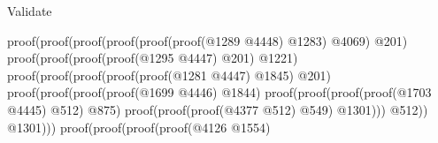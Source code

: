 \begin{lexlean}{Validate}
\begin{coremodule}
                                                                proof(proof(proof(proof(proof(proof(@1289
                                                                              @4448)
                                                                            @1283)
                                                                          @4069)
                                                                        @201)
                                                                      proof(proof(proof(proof(@1295
                                                                                @4447)
                                                                              @201)
                                                                            @1221)
                                                                          proof(proof(proof(proof(proof(@1281
                                                                                      @4447)
                                                                                    @1845)
                                                                                  @201)
                                                                                proof(proof(proof(proof(@1699
                                                                                          @4446)
                                                                                        @1844)
                                                                                      proof(proof(proof(proof(@1703
                                                                                                @4445)
                                                                                              @512)
                                                                                            @875)
                                                                                          proof(proof(proof(@4377
                                                                                                  @512)
                                                                                                @549)
                                                                                              @1301)))
                                                                                    @512))
                                                                              @1301)))
                                                                    proof(proof(proof(proof(@4126
                                                                              @1554)

\end{coremodule}
\end{lexlean}
